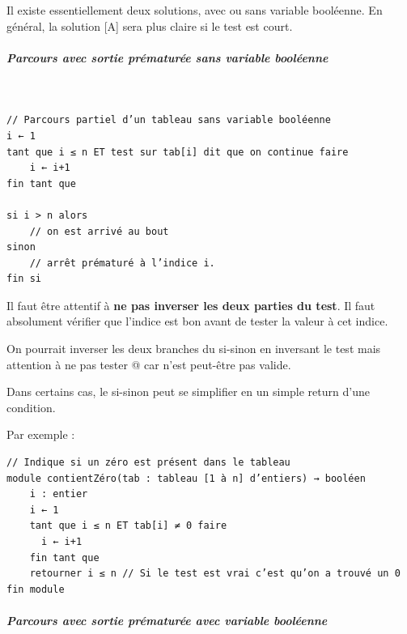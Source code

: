 \documentclass[11pt,a4paper]{article}
\begin{document}
            \par
        
        Il existe essentiellement deux solutions, avec ou sans variable bool\'eenne. En g\'en\'eral, la
        solution [A] sera plus claire si le test est court.
		  
            \par
        
			
		\subparagraph{Parcours avec sortie pr\'ematur\'ee sans variable bool\'eenne} 
		
					\textcolor{white}{.} \par
				
            \par
        \begin{verbatim}
// Parcours partiel d’un tableau sans variable booléenne
i ← 1
tant que i ≤ n ET test sur tab[i] dit que on continue faire
    i ← i+1
fin tant que

si i > n alors
    // on est arrivé au bout
sinon
    // arrêt prématuré à l’indice i.
fin si
      \end{verbatim}
        Il faut \^etre attentif \`a \textbf{ne pas inverser les deux parties du test}. 
        Il faut absolument v\'erifier  que l'indice est bon avant de tester la valeur \`a cet indice.
      
            \par
        
        On pourrait inverser les deux branches du si-sinon en inversant le test mais attention \`a ne
        pas tester \verb@tab[i]@ car \verb@i@ n'est peut-\^etre pas valide.
      
            \par
        
        Dans certains cas, le si-sinon peut se simplifier en un simple return d'une condition.
      
            \par
        Par exemple : 
            \par
        \begin{verbatim}
// Indique si un zéro est présent dans le tableau
module contientZéro(tab : tableau [1 à n] d’entiers) → booléen
    i : entier
    i ← 1
    tant que i ≤ n ET tab[i] ≠ 0 faire
      i ← i+1
    fin tant que
    retourner i ≤ n // Si le test est vrai c’est qu’on a trouvé un 0
fin module
      \end{verbatim}
			
		\subparagraph{Parcours avec sortie pr\'ematur\'ee avec variable bool\'eenne} 
		
\end{document}
